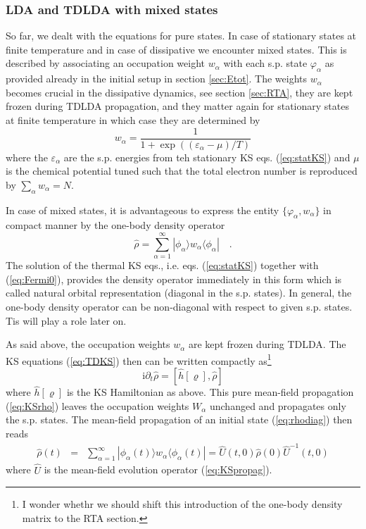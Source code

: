 \documentclass[final,1p]{elsarticle}
\newcommand{\I}{\mathrm{i}}
\newcommand{\PGRfoot}[1]{{\color{blue}\footnote{\color{blue} #1}}}
\begin{document}
\subsubsection{LDA and TDLDA with mixed states}
\label{sec:mix}

So far, we dealt with the equations for pure states.  In case of
stationary states at finite temperature and in case of dissipative we
encounter mixed states.  This is described by associating an
occupation weight $w_\alpha$ with each s.p. state $\varphi_\alpha$ as
provided already in the initial setup in section \ref{sec:Etot}.  The
weights $w_\alpha$ becomes crucial in the dissipative dynamics, see
section \ref{sec:RTA}, they are kept frozen during TDLDA propagation,
and they matter again for stationary states at finite temperature
in which case they are determined by
\begin{equation}
  w_\alpha
  =
  \frac{1}{1+\exp((\varepsilon_\alpha-\mu)/T)}
\label{eq:Fermi0}
\end{equation}
where the $\varepsilon_\alpha$ are the s.p. energies from teh
stationary KS eqs. (\ref{eq:statKS}) and $\mu$ is the chemical
potential tuned such that the total electron number is reproduced by
$\sum_\alpha w_\alpha=N$.

In case of mixed states, it is advantageous to express the
entity $\{\varphi_\alpha,w_\alpha\}$ in compact manner by the one-body
density operator 
\begin{equation}
  \hat{\rho}
  =
  \sum_{\alpha=1}^\infty|\phi_\alpha\rangle w_\alpha\langle\phi_\alpha|
  \quad.
\label{eq:rhodiag}
\end{equation}
The solution of the thermal KS eqs., i.e. eqs. (\ref{eq:statKS})
together with (\ref{eq:Fermi0}), provides the density operator
immediately in this form which is called natural orbital
representation (diagonal in the s.p. states). In general, the
one-body density operator can be non-diagonal with respect to given
s.p. states. Tis will play a role later on.

As said above, the occupation weights $w_\alpha$ are kept frozen
during TDLDA.  The KS equations (\ref{eq:TDKS}) then can be written
compactly as\PGRfoot{I wonder whethr we should shift this introduction
of the one-body density matrix to the RTA section.}
\begin{equation}
  \I\partial_t\hat{\rho}
  =
  \left[\hat{h}[\varrho],\hat{\rho}\right]
\label{eq:KSrho}
\end{equation}
where $\hat{h}[\varrho]$ is the KS Hamiltonian as above.
This  pure mean-field propagation (\ref{eq:KSrho})
leaves the occupation weights $W_\alpha$ unchanged and propagates only
the s.p. states.  The mean-field propagation of an initial state
(\ref{eq:rhodiag}) then reads
\begin{eqnarray}
  \hat{\rho}(t)
  &=&
  \sum_{\alpha=1}^\infty
  |\phi_\alpha(t)\rangle w_\alpha\langle\phi_\alpha(t)|
  =
  \hat{U}(t,0)\hat{\rho}(0)\hat{U}^{-1}(t,0)
\label{eq:KSrhoevol}
\end{eqnarray}
where $\hat{U}$ is the mean-field evolution operator (\ref{eq:KSpropag}).
\end{document}
